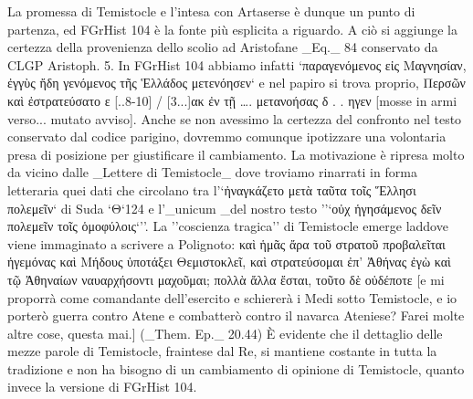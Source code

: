 {            La promessa di Temistocle e l'intesa con Artaserse  è dunque un punto di partenza, ed FGrHist 104 è la fonte più esplicita a riguardo. A ciò si aggiunge la certezza della provenienza dello scolio ad Aristofane  _Eq._ 84 conservato da CLGP Aristoph. 5. In FGrHist 104 abbiamo infatti `παραγενόμενος εἰς Μαγνησίαν, ἐγγὺς ἤδη γενόμενος τῆς Ἑλλάδος μετενόησεν` e nel papiro si trova proprio, \textgreek{ Περσῶν καὶ ἐστρατεύσατο ε [..8-10] / [3...]ακ ἐν τῇ …. μετανοήσας δ . . ηγεν} [mosse in armi verso... mutato avviso]. Anche se non avessimo la certezza del confronto nel testo conservato dal codice parigino, dovremmo comunque ipotizzare una volontaria presa di posizione per giustificare il cambiamento. La motivazione è ripresa molto da vicino dalle _Lettere di Temistocle_ dove troviamo rinarrati in forma letteraria quei dati che circolano tra l'`ἠναγκάζετο μετὰ ταῦτα τοῖς Ἕλλησι πολεμεῖν` di Suda `Θ`124 e l'_unicum _del nostro testo ''`οὐχ ἡγησάμενος δεῖν πολεμεῖν τοῖς ὁμοφύλοις`''. La ''coscienza tragica'' di Temistocle emerge laddove viene immaginato a scrivere a Polignoto: \textgreek{καὶ ἡμᾶς ἄρα τοῦ στρατοῦ προβαλεῖται ἡγεμόνας καὶ Μήδους ὑποτάξει Θεμιστοκλεῖ, καὶ στρατεύσομαι ἐπ’ Ἀθήνας ἐγὼ καὶ τῷ Ἀθηναίων ναυαρχήσοντι μαχοῦμαι; πολλὰ ἄλλα ἔσται, τοῦτο δὲ οὐδέποτε} [e mi proporrà come comandante dell'esercito e schiererà i Medi sotto Temistocle, e io porterò guerra contro Atene e combatterò  contro il navarca Ateniese? Farei molte altre cose, questa mai.] (_Them. Ep._  20.44) È evidente che il dettaglio delle mezze parole di Temistocle, fraintese dal Re, si mantiene costante in tutta la tradizione e non ha bisogno di un cambiamento di opinione di Temistocle, quanto invece la versione di FGrHist 104. 
}
